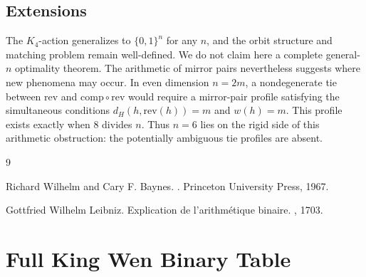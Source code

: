 \documentclass[11pt]{article}
\theoremstyle{definition}
\theoremstyle{plain}
\newcommand{\B}{\{0,1\}}
\newcommand{\Ham}{d_H}
\newcommand{\comp}{\mathrm{comp}}
\newcommand{\rev}{\mathrm{rev}}
\begin{document}
\subsection{Extensions}

The $K_4$-action generalizes to $\B^n$ for any $n$, and the orbit structure and matching problem remain well-defined. We do not claim here a complete general-$n$ optimality theorem. The arithmetic of mirror pairs nevertheless suggests where new phenomena may occur. In even dimension $n=2m$, a nondegenerate tie between $\rev$ and $\comp\circ\rev$ would require a mirror-pair profile satisfying the simultaneous conditions $\Ham(h,\rev(h))=m$ and $w(h)=m$. This profile exists exactly when $8$ divides $n$. Thus $n=6$ lies on the rigid side of this arithmetic obstruction: the potentially ambiguous tie profiles are absent.

\begin{thebibliography}{9}

Richard Wilhelm and Cary F. Baynes.
.
\newblock Princeton University Press, 1967.

Gottfried Wilhelm Leibniz.
\newblock Explication de l'arithm\'etique binaire.
, 1703.

\end{thebibliography}

\appendix

\section{Full King Wen Binary Table}
\end{document}
